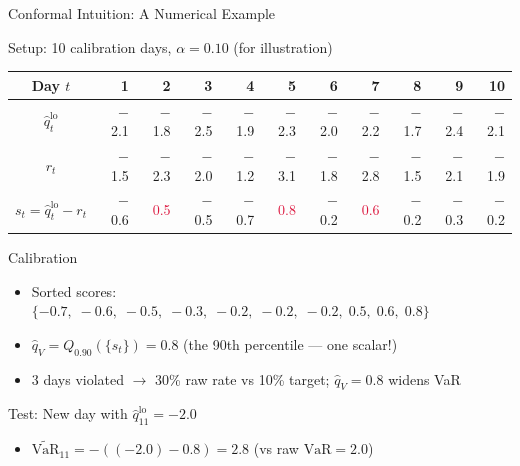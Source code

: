 \documentclass[9pt, aspectratio=169, t]{beamer}
\newcommand{\VaR}{\mathrm{VaR}}
\newcommand{\qV}{\hat{q}_V}
\begin{document}
\begin{frame}{Conformal Intuition: A Numerical Example}
	\vspace{-0.2cm}
	{\small
	\begin{block}{Setup: 10 calibration days, $\alpha = 0.10$ (for illustration)}
	{\scriptsize
	\begin{center}
	\begin{tabular}{c|rrrrrrrrrr}
	Day $t$    & 1     & 2     & 3     & 4     & 5     & 6     & 7     & 8     & 9     & 10 \\ \hline
	$\hat{q}_t^{\mathrm{lo}}$ & $-$2.1 & $-$1.8 & $-$2.5 & $-$1.9 & $-$2.3 & $-$2.0 & $-$2.2 & $-$1.7 & $-$2.4 & $-$2.1 \\
	$r_t$          & $-$1.5 & $-$2.3 & $-$2.0 & $-$1.2 & $-$3.1 & $-$1.8 & $-$2.8 & $-$1.5 & $-$2.1 & $-$1.9 \\
	$s_t = \hat{q}_t^{\mathrm{lo}} - r_t$ & $-$0.6 & \textcolor{Crimson}{0.5} & $-$0.5 & $-$0.7 & \textcolor{Crimson}{0.8} & $-$0.2 & \textcolor{Crimson}{0.6} & $-$0.2 & $-$0.3 & $-$0.2
	\end{tabular}
	\end{center}
	}
	\end{block}
	\vspace{1mm}
	\begin{exampleblock}{Calibration}
		\begin{itemize}\setlength{\itemsep}{1pt}
			\item Sorted scores: $\{-0.7,\; -0.6,\; -0.5,\; -0.3,\; -0.2,\; -0.2,\; -0.2,\; 0.5,\; 0.6,\; \mathbf{0.8}\}$
			\item $\qV = Q_{0.90}(\{s_t\}) = 0.8$ (the 90th percentile --- one scalar!)
			\item 3 days violated $\to$ 30\% raw rate vs 10\% target; $\qV = 0.8$ widens VaR
		\end{itemize}
	\end{exampleblock}
	\vspace{1mm}
	\begin{block}{Test: New day with $\hat{q}_{11}^{\mathrm{lo}} = -2.0$}
		\begin{itemize}\setlength{\itemsep}{0pt}
			\item $\widetilde{\VaR}_{11} = -((-2.0) - 0.8) = 2.8$ (vs raw $\VaR = 2.0$)
		\end{itemize}
	\end{block}
	}
\end{frame}
\end{document}
